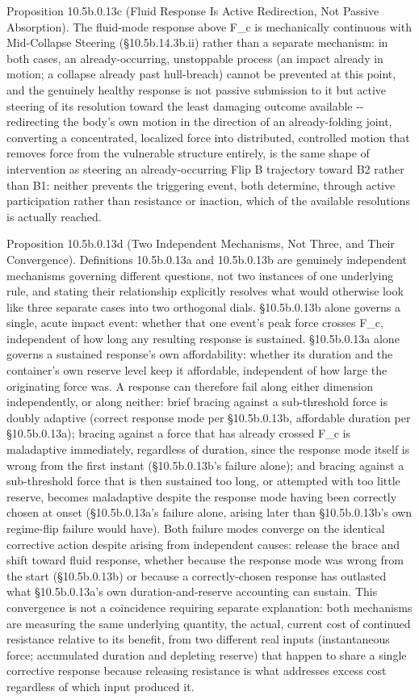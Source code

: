 \documentclass[
]{article}
\begin{document}
Proposition 10.5b.0.13c (Fluid Response Is Active Redirection, Not
Passive Absorption). The fluid-mode response above F\_c is mechanically
continuous with Mid-Collapse Steering (§10.5b.14.3b.ii) rather than a
separate mechanism: in both cases, an already-occurring, unstoppable
process (an impact already in motion; a collapse already past
hull-breach) cannot be prevented at this point, and the genuinely
healthy response is not passive submission to it but active steering of
its resolution toward the least damaging outcome available -\/-
redirecting the body's own motion in the direction of an already-folding
joint, converting a concentrated, localized force into distributed,
controlled motion that removes force from the vulnerable structure
entirely, is the same shape of intervention as steering an
already-occurring Flip B trajectory toward B2 rather than B1: neither
prevents the triggering event, both determine, through active
participation rather than resistance or inaction, which of the available
resolutions is actually reached.

Proposition 10.5b.0.13d (Two Independent Mechanisms, Not Three, and
Their Convergence). Definitions 10.5b.0.13a and 10.5b.0.13b are
genuinely independent mechanisms governing different questions, not two
instances of one underlying rule, and stating their relationship
explicitly resolves what would otherwise look like three separate cases
into two orthogonal dials. §10.5b.0.13b alone governs a single, acute
impact event: whether that one event's peak force crosses F\_c,
independent of how long any resulting response is sustained.
§10.5b.0.13a alone governs a sustained response's own affordability:
whether its duration and the container's own reserve level keep it
affordable, independent of how large the originating force was. A
response can therefore fail along either dimension independently, or
along neither: brief bracing against a sub-threshold force is doubly
adaptive (correct response mode per §10.5b.0.13b, affordable duration
per §10.5b.0.13a); bracing against a force that has already crossed F\_c
is maladaptive immediately, regardless of duration, since the response
mode itself is wrong from the first instant (§10.5b.0.13b's failure
alone); and bracing against a sub-threshold force that is then sustained
too long, or attempted with too little reserve, becomes maladaptive
despite the response mode having been correctly chosen at onset
(§10.5b.0.13a's failure alone, arising later than §10.5b.0.13b's own
regime-flip failure would have). Both failure modes converge on the
identical corrective action despite arising from independent causes:
release the brace and shift toward fluid response, whether because the
response mode was wrong from the start (§10.5b.0.13b) or because a
correctly-chosen response has outlasted what §10.5b.0.13a's own
duration-and-reserve accounting can sustain. This convergence is not a
coincidence requiring separate explanation: both mechanisms are
measuring the same underlying quantity, the actual, current cost of
continued resistance relative to its benefit, from two different real
inputs (instantaneous force; accumulated duration and depleting reserve)
that happen to share a single corrective response because releasing
resistance is what addresses excess cost regardless of which input
produced it.
\end{document}
